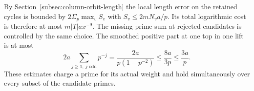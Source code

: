 By Section~\ref{subsec:column-orbit-length} the local length
error on the retained cycles is bounded by \(2\Sigma_p\max_v S_v\)
with \(S_v\le2mN_v a/p\). Its total logarithmic cost is therefore
at most \(m|T|a x^{-9}\). The missing prime sum at rejected
candidates is controlled by the same choice. The smoothed
positive part at one top in one lift is at most
\[
 2a\sum_{j\ge1,\ j\text{ odd}}p^{-j}
   =\frac{2a}{p(1-p^{-2})}\le\frac{8a}{3p}\le\frac{3a}p .
\] These estimates charge a prime for its actual
weight and hold simultaneously over every subset of the
candidate primes.
